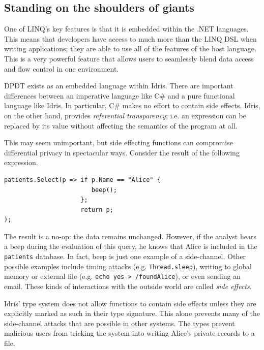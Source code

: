\documentclass[12pt]{report}
\begin{document}
\subsection{Standing on the shoulders of giants}

One of LINQ's key features is that it is embedded within the .NET languages.
This means that developers have access to much more than the LINQ DSL when writing applications; they are able to use all of the features of the host language.
This is a very powerful feature that allows users to seamlessly blend data access and flow control in one environment.

DPDT exists as an embedded language within Idris.
There are important differences between an imperative language like C\# and a pure functional language like Idris.
In particular, C\# makes no effort to contain side effects.
Idris, on the other hand, provides \textit{referential transparency}; i.e. an expression can be replaced by its value without affecting the semantics of the program at all.

This may seem unimportant, but side effecting functions can compromise differential privacy in spectacular ways.
Consider the result of the following expression.

\begin{lstlisting}[float,caption={Example side-channel attack}]
patients.Select(p => if p.Name == "Alice" {
                        beep();
                     };
                     return p;
);
\end{lstlisting}

The result is a no-op: the data remains unchanged.
However, if the analyst hears a beep during the evaluation of this query, he knows that Alice is included in the \texttt{patients} database.
In fact, beep is just one example of a side-channel.
Other possible examples include timing attacks (e.g. \texttt{Thread.sleep}), writing to global memory or external file (e.g. \texttt{echo yes > /foundAlice}), or even sending an email.
These kinds of interactions with the outside world are called \textit{side effects}.

Idris' type system does not allow functions to contain side effects unless they are explicitly marked as such in their type signature.
This alone prevents many of the side-channel attacks that are possible in other systems.
The types prevent malicious users from tricking the system into writing Alice's private records to a file.
\end{document}
